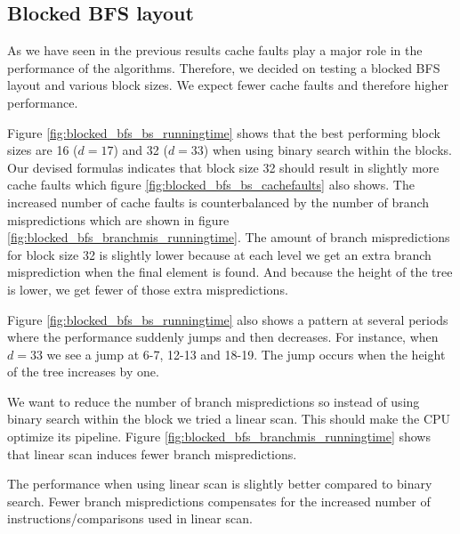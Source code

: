 \subsection{Blocked BFS layout}

As we have seen in the previous results cache faults play a major role in the performance of the algorithms. Therefore, we decided on testing a blocked BFS layout and various block sizes. We expect fewer cache faults and therefore higher performance.

Figure \ref{fig:blocked_bfs_bs_runningtime} shows that the best performing block sizes are 16 ($d = 17$) and 32 ($d = 33$) when using binary search within the blocks. Our devised formulas indicates that block size 32 should result in slightly more cache faults which figure \ref{fig:blocked_bfs_bs_cachefaults} also shows. The increased number of cache faults is counterbalanced by the number of branch mispredictions which are shown in figure \ref{fig:blocked_bfs_branchmis_runningtime}. The amount of branch mispredictions for block size 32 is slightly lower because at each level we get an extra branch misprediction when the final element is found. And because the height of the tree is lower, we get fewer of those extra mispredictions.

Figure \ref{fig:blocked_bfs_bs_runningtime} also shows a pattern at several periods where the performance suddenly jumps and then decreases. For instance, when $d = 33$ we see a jump at 6-7, 12-13 and 18-19. The jump occurs when the height of the tree increases by one.

We want to reduce the number of branch mispredictions so instead of using binary search within the block we tried a linear scan. This should make the CPU optimize its pipeline. Figure \ref{fig:blocked_bfs_branchmis_runningtime} shows that linear scan induces fewer branch mispredictions.

The performance when using linear scan is slightly better compared to binary search. Fewer branch mispredictions compensates for the increased number of instructions/comparisons used in linear scan.

